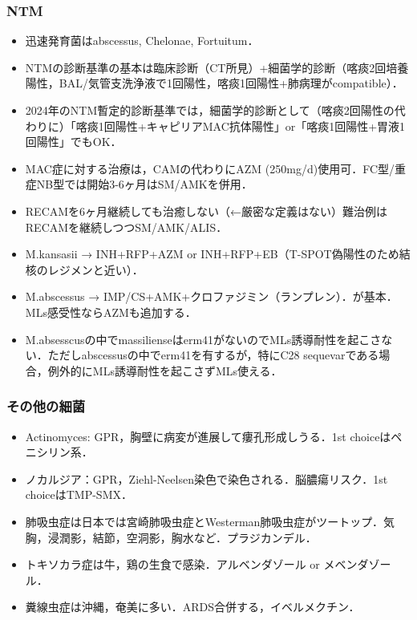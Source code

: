 \subsubsection{NTM}
\begin{itemize}
\item 迅速発育菌はabscessus, Chelonae, Fortuitum．
\item NTMの診断基準の基本は臨床診断（CT所見）+細菌学的診断（喀痰2回培養陽性，BAL/気管支洗浄液で1回陽性，喀痰1回陽性+肺病理がcompatible）．
\item 2024年のNTM暫定的診断基準では，細菌学的診断として（喀痰2回陽性の代わりに）「喀痰1回陽性+キャピリアMAC抗体陽性」or「喀痰1回陽性+胃液1回陽性」でもOK．
\item MAC症に対する治療は，CAMの代わりにAZM (250mg/d)使用可．FC型/重症NB型では開始3-6ヶ月はSM/AMKを併用．
\item RECAMを6ヶ月継続しても治癒しない（←厳密な定義はない）難治例はRECAMを継続しつつSM/AMK/ALIS．
\item M.kansasii → INH+RFP+AZM or INH+RFP+EB（T-SPOT偽陽性のため結核のレジメンと近い）．
\item M.abscessus → IMP/CS+AMK+クロファジミン（ランプレン\circledR）．が基本．MLs感受性ならAZMも追加する．
\item M.absesscusの中でmassilienseはerm41がないのでMLs誘導耐性を起こさない．ただしabscessusの中でerm41を有するが，特にC28 sequevarである場合，例外的にMLs誘導耐性を起こさずMLs使える．


\end{itemize}

\subsubsection{その他の細菌}

\begin{itemize}


\item Actinomyces: GPR，胸壁に病変が進展して瘻孔形成しうる．1st choiceはペニシリン系．
\item ノカルジア：GPR，Ziehl-Neelsen染色で染色される．脳膿瘍リスク．1st choiceはTMP-SMX．

\item 肺吸虫症は日本では宮崎肺吸虫症とWesterman肺吸虫症がツートップ．気胸，浸潤影，結節，空洞影，胸水など．プラジカンデル．
\item トキソカラ症は牛，鶏の生食で感染．アルベンダゾール or メベンダゾール．
\item 糞線虫症は沖縄，奄美に多い．ARDS合併する，イベルメクチン．



\end{itemize}

